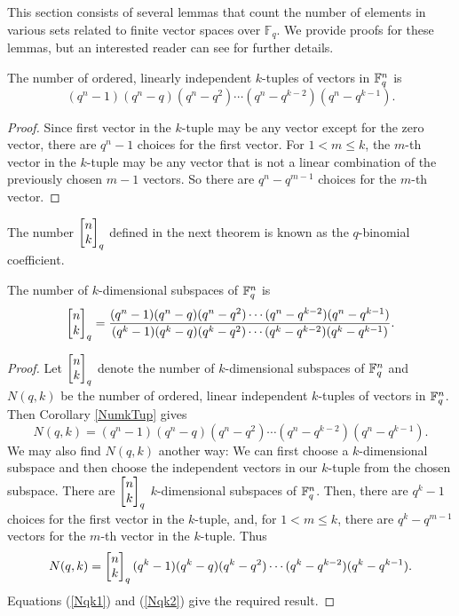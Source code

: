 This section consists of several lemmas that count the number of elements in various sets related to finite vector spaces over $\mathbb{F}_q$.  We provide proofs for these lemmas, but an interested reader can see \cite{stanley2011enumerative} for further details. 
\begin{lemma}\label{NumkTup}
  The number of ordered, linearly independent $k$-tuples of vectors in $\mathbb{F}_q^{n}$  is
\[
(q^n-1)(q^n-q)(q^n-q^2)\cdots(q^n - q^{k-2})(q^n-q^{k-1}).
\]
\end{lemma}

\begin{proof}
Since first vector in the $k$-tuple may be any vector except for the zero vector, there are $q^n-1$ choices for the first vector.  For $1<m \leq k$, the $m$-th vector in the $k$-tuple may be any vector that is not a linear combination of the previously chosen $m-1$ vectors. So there are $q^n - q^{m-1}$ choices for the $m$-th vector.
\end{proof}

The number $\begin{bmatrix}{n}\\ {k}\end{bmatrix}_q$ defined in the next theorem is known as the $q$-binomial coefficient.

\begin{lemma}\label{NumkSub}
  The number of $k$-dimensional subspaces of $\mathbb{F}_q^{n}$ is
\[
\begin{bmatrix}{n}\\ {k}\end{bmatrix}_q = \frac{(q^n-1)(q^n-q)(q^n-q^2)\cdots(q^n - q^{k-2})(q^n-q^{k-1})}{(q^k-1)(q^k-q)(q^k-q^2)\cdots(q^k - q^{k-2})(q^k-q^{k-1})}.
\]
\end{lemma}


\begin{proof}
  Let $\begin{bmatrix}{n}\\ {k}\end{bmatrix}_q$ denote the number of $k$-dimensional subspaces of $\mathbb{F}_q^{n}$ and $N(q,k)$ be the number of ordered, linear independent $k$-tuples of vectors in $\mathbb{F}_q^{n}$.  Then Corollary \ref{NumkTup} gives
\begin{equation}\label{Nqk1}
N(q,k) = (q^n-1)(q^n-q)(q^n-q^2)\cdots(q^n - q^{k-2})(q^n-q^{k-1}).
\end{equation}
We may also find $N(q,k)$ another way: We can first choose a $k$-dimensional subspace and then choose the independent vectors in our $k$-tuple from the chosen subspace.  There are $\begin{bmatrix}{n}\\ {k}\end{bmatrix}_q$ $k$-dimensional subspaces of $\mathbb{F}_q^{n}$.  Then, there are $q^k-1$ choices for the first vector in the $k$-tuple, and, for $1<m \leq k$, there are $q^k - q^{m-1}$ vectors for the $m$-th vector in the $k$-tuple.  Thus
\begin{equation}\label{Nqk2}
N(q,k) = \begin{bmatrix}{n}\\ {k}\end{bmatrix}_q(q^k-1)(q^k-q)(q^k-q^2)\cdots(q^k - q^{k-2})(q^k-q^{k-1}).
\end{equation}
Equations (\ref{Nqk1}) and (\ref{Nqk2}) give the required result.
\end{proof}

